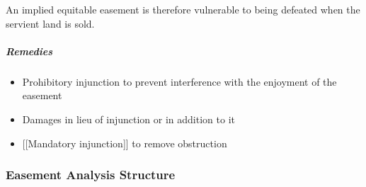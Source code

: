 \documentclass[
]{article}
\providecommand{\tightlist}{%
  \setlength{\itemsep}{0pt}\setlength{\parskip}{0pt}}
\begin{document}
An implied equitable easement is therefore vulnerable to being defeated
when the servient land is sold.

\hypertarget{remedies-1}{%
\subparagraph{Remedies}\label{remedies-1}}

\begin{itemize}
\tightlist
\item
  Prohibitory injunction to prevent interference with the enjoyment of
  the easement
\item
  Damages in lieu of injunction or in addition to it
\item
  {[}{[}Mandatory injunction{]}{]} to remove obstruction
\end{itemize}

\hypertarget{easement-analysis-structure}{%
\subsubsection{Easement Analysis
Structure}\label{easement-analysis-structure}}
\end{document}
